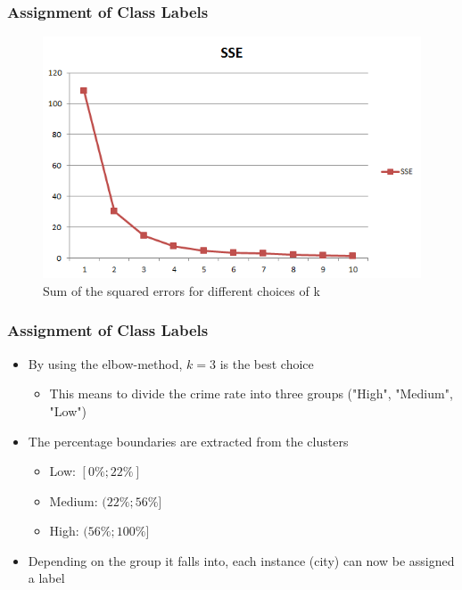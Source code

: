\begin{frame}
  \frametitle{Assignment of Class Labels}
  \begin{figure}[H]
    \centering
    \includegraphics[width=0.8\columnwidth]{../../charts/SSE.png}
    \caption{Sum of the squared errors for different choices of k}
    \label{fig:sse}
  \end{figure}
\end{frame}

\begin{frame}
  \frametitle{Assignment of Class Labels}
  \onslide<+->
  \begin{itemize}
    \item<+-> By using the elbow-method, \(k=3\) is the best choice
      \begin{itemize}
        \item<+-> This means to divide the crime rate into three groups ("High", "Medium", "Low")
      \end{itemize}
    \item<+-> The percentage boundaries are extracted from the clusters
      \begin{itemize}
        \item<+-> Low: \([0\%; 22\%]\) 
	\item<+-> Medium: \((22\%; 56\%]\)
	\item<+-> High: \((56\%; 100\%]\)
      \end{itemize}
    \item<+-> Depending on the group it falls into, each instance (city) can now be assigned a label
  \end{itemize}
\end{frame}

